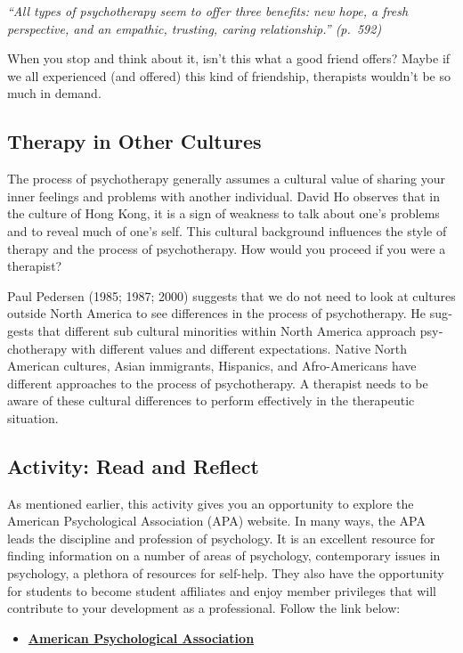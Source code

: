 \documentclass[
]{book}
\providecommand{\tightlist}{%
  \setlength{\itemsep}{0pt}\setlength{\parskip}{0pt}}
\begin{document}
\emph{``All types of psychotherapy seem to offer three benefits: new hope, a fresh perspective, and an empathic, trusting, caring relationship.'' (p.~592)}

When you stop and think about it, isn't this what a good friend offers? Maybe if we all experienced (and offered) this kind of friendship, therapists wouldn't be so much in demand.

\hypertarget{therapy-in-other-cultures}{%
\subsection*{Therapy in Other Cultures}\label{therapy-in-other-cultures}}

The process of psychotherapy generally assumes a cultural value of sharing your inner feelings and problems with another individual. David Ho observes that in the culture of Hong Kong, it is a sign of weakness to talk about one's problems and to reveal much of one's self. This cultural background influences the style of therapy and the process of psychotherapy. How would you proceed if you were a therapist?

Paul Pedersen (1985; 1987; 2000) suggests that we do not need to look at cultures outside North America to see differences in the process of psychotherapy. He sug­gests that different sub cultural minorities within North America approach psy­chotherapy with different values and different expectations. Native North American cultures, Asian immigrants, Hispanics, and Afro-Americans have different approaches to the pro­cess of psychotherapy. A therapist needs to be aware of these cultural differ­ences to perform effectively in the therapeutic situation.

\hypertarget{activity-read-and-reflect-21}{%
\subsection*{Activity: Read and Reflect}\label{activity-read-and-reflect-21}}

\begin{reflect}
As mentioned earlier, this activity gives you an opportunity to explore the American Psychological Association (APA) website. In many ways, the APA leads the discipline and profession of psychology. It is an excellent resource for finding information on a number of areas of psychology, contemporary issues in psychology, a plethora of resources for self-help. They also have the opportunity for students to become student affiliates and enjoy member privileges that will contribute to your development as a professional. Follow the link below:

\begin{itemize}
\tightlist
\item
  \href{https://www.apa.org/}{\textbf{American Psychological Association}}
\end{itemize}
\end{reflect}
\end{document}
